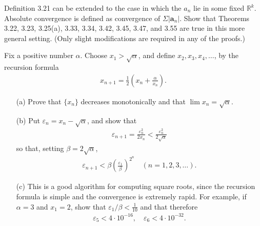   \begin{exercise}[Rudin 3.15]
    Definition 3.21 can be extended to the case in which the $a_n$ lie in some fixed $\mathbb{R}^k$. Absolute convergence is defined as convergence of $\Sigma |\mathbf{a}_n|$. Show that Theorems 3.22, 3.23, 3.25(a), 3.33, 3.34, 3.42, 3.45, 3.47, and 3.55 are true in this more general setting. (Only slight modifications are required in any of the proofs.)
  \end{exercise}
  \begin{solution}
    
  \end{solution}

  \begin{exercise}[Rudin 3.16]
    Fix a positive number $\alpha$. Choose $x_1 > \sqrt{\alpha}$, and define $x_2, x_3, x_4, \ldots$, by the recursion formula
    \begin{align*}
      x_{n+1} = \frac{1}{2}\left(x_n + \frac{\alpha}{x_n}\right).
    \end{align*}
    \begin{enumerate} 
      \item[(a)] Prove that $\{x_n\}$ decreases monotonically and that $\lim x_n = \sqrt{\alpha}$.
      \item[(b)] Put $\varepsilon_n = x_n - \sqrt{\alpha}$, and show that
      \begin{align*}
        \varepsilon_{n+1} = \frac{\varepsilon_n^2}{2x_n} < \frac{\varepsilon_n^2}{2\sqrt{\alpha}}
      \end{align*}
      so that, setting $\beta = 2\sqrt{\alpha}$,
      \begin{align*}
        \varepsilon_{n+1} < \beta \left(\frac{\varepsilon_1}{\beta}\right)^{2^n} \quad (n = 1, 2, 3, \ldots).
      \end{align*}
      \item[(c)] This is a good algorithm for computing square roots, since the recursion formula is simple and the convergence is extremely rapid. For example, if $\alpha = 3$ and $x_1 = 2$, show that $\varepsilon_1/\beta < \frac{1}{10}$ and that therefore
      \begin{align*}
        \varepsilon_5 < 4 \cdot 10^{-16}, \quad \varepsilon_6 < 4 \cdot 10^{-32}.
      \end{align*}
    \end{enumerate}
  \end{exercise}
  \begin{solution}
    
  \end{solution}

